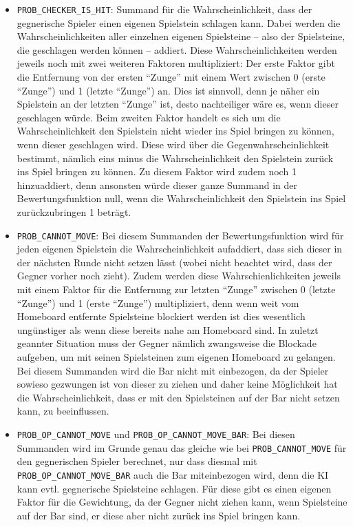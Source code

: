 \begin{itemize}
  \item \lstinline$PROB_CHECKER_IS_HIT$: Summand für die Wahrscheinlichkeit, dass der gegnerische Spieler einen eigenen Spielstein schlagen kann. Dabei werden die Wahrscheinlichkeiten aller einzelnen eigenen Spielsteine -- also der Spielsteine, die geschlagen werden können -- addiert. Diese Wahrscheinlichkeiten werden jeweils noch mit zwei weiteren Faktoren multipliziert: Der erste Faktor gibt die Entfernung von der ersten "`Zunge"' mit einem Wert zwischen 0 (erste "`Zunge"') und 1 (letzte "`Zunge"') an. Dies ist sinnvoll, denn je näher ein Spielstein an der letzten "`Zunge"' ist, desto nachteiliger wäre es, wenn dieser geschlagen würde. Beim zweiten Faktor handelt es sich um die Wahrscheinlichkeit den Spielstein nicht wieder ins Spiel bringen zu können, wenn dieser geschlagen wird. Diese wird über die Gegenwahrscheinlichkeit bestimmt, nämlich eins minus die Wahrscheinlichkeit den Spielstein zurück ins Spiel bringen zu können. Zu diesem Faktor wird zudem noch 1 hinzuaddiert, denn ansonsten würde dieser ganze Summand in der Bewertungsfunktion null, wenn die Wahrscheinlichkeit den Spielstein ins Spiel zurückzubringen 1 beträgt.
  \item \lstinline$PROB_CANNOT_MOVE$: Bei diesem Summanden der Bewertungsfunktion wird für jeden eigenen Spielstein die Wahrscheinlichkeit aufaddiert, dass sich dieser in der nächsten Runde nicht setzen lässt (wobei nicht beachtet wird, dass der Gegner vorher noch zieht). Zudem werden diese Wahrschienlichkeiten jeweils mit einem Faktor für die Entfernung zur letzten "`Zunge"' zwischen 0 (letzte "`Zunge"') und 1 (erste "`Zunge"') multipliziert, denn wenn weit vom Homeboard entfernte Spielsteine blockiert werden ist dies wesentlich ungünstiger als wenn diese bereits nahe am Homeboard sind. In zuletzt geannter Situation muss der Gegner nämlich zwangsweise die Blockade aufgeben, um mit seinen Spielsteinen zum eigenen Homeboard zu gelangen. Bei diesem Summanden wird die Bar nicht mit einbezogen, da der Spieler sowieso gezwungen ist von dieser zu ziehen und daher keine Möglichkeit hat die Wahrscheinlichkeit, dass er mit den Spielsteinen auf der Bar nicht setzen kann, zu beeinflussen.
  \item \lstinline$PROB_OP_CANNOT_MOVE$ und \lstinline$PROB_OP_CANNOT_MOVE_BAR$: Bei diesen Summanden wird im Grunde genau das gleiche wie bei \lstinline$PROB_CANNOT_MOVE$ für den gegnerischen Spieler berechnet, nur dass diesmal mit \lstinline$PROB_OP_CANNOT_MOVE_BAR$ auch die Bar miteinbezogen wird, denn die KI kann evtl. gegnerische Spielsteine schlagen. Für diese gibt es einen eigenen Faktor für die Gewichtung, da der Gegner nicht ziehen kann, wenn Spielsteine auf der Bar sind, er diese aber nicht zurück ins Spiel bringen kann.

\end{itemize}
